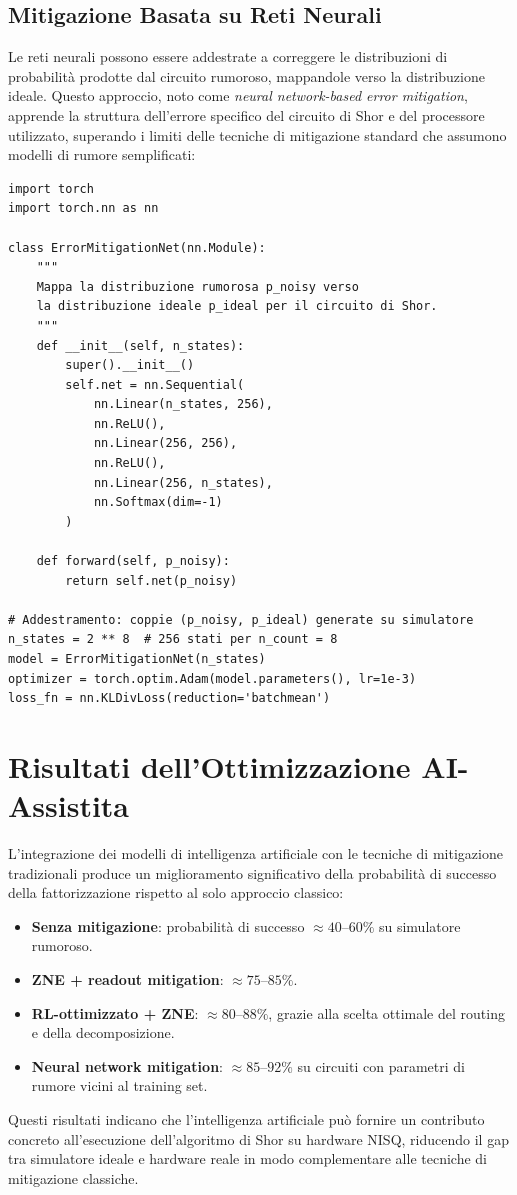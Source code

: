 \begin{onehalfspace}
\subsection{Mitigazione Basata su Reti Neurali}

Le reti neurali possono essere addestrate a correggere le distribuzioni di probabilità prodotte dal circuito rumoroso, mappandole verso la distribuzione ideale. Questo approccio, noto come \textit{neural network-based error mitigation}, apprende la struttura dell'errore specifico del circuito di Shor e del processore utilizzato, superando i limiti delle tecniche di mitigazione standard che assumono modelli di rumore semplificati:

\begin{lstlisting}[caption={Rete neurale per la correzione delle distribuzioni di probabilità}]
import torch
import torch.nn as nn

class ErrorMitigationNet(nn.Module):
    """
    Mappa la distribuzione rumorosa p_noisy verso
    la distribuzione ideale p_ideal per il circuito di Shor.
    """
    def __init__(self, n_states):
        super().__init__()
        self.net = nn.Sequential(
            nn.Linear(n_states, 256),
            nn.ReLU(),
            nn.Linear(256, 256),
            nn.ReLU(),
            nn.Linear(256, n_states),
            nn.Softmax(dim=-1)
        )

    def forward(self, p_noisy):
        return self.net(p_noisy)

# Addestramento: coppie (p_noisy, p_ideal) generate su simulatore
n_states = 2 ** 8  # 256 stati per n_count = 8
model = ErrorMitigationNet(n_states)
optimizer = torch.optim.Adam(model.parameters(), lr=1e-3)
loss_fn = nn.KLDivLoss(reduction='batchmean')
\end{lstlisting}

\section{Risultati dell'Ottimizzazione AI-Assistita}

L'integrazione dei modelli di intelligenza artificiale con le tecniche di mitigazione tradizionali produce un miglioramento significativo della probabilità di successo della fattorizzazione rispetto al solo approccio classico:

\begin{itemize}
    \item \textbf{Senza mitigazione}: probabilità di successo $\approx 40$--$60\%$ su simulatore rumoroso.
    \item \textbf{ZNE + readout mitigation}: $\approx 75$--$85\%$.
    \item \textbf{RL-ottimizzato + ZNE}: $\approx 80$--$88\%$, grazie alla scelta ottimale del routing e della decomposizione.
    \item \textbf{Neural network mitigation}: $\approx 85$--$92\%$ su circuiti con parametri di rumore vicini al training set.
\end{itemize}

Questi risultati indicano che l'intelligenza artificiale può fornire un contributo concreto all'esecuzione dell'algoritmo di Shor su hardware NISQ, riducendo il gap tra simulatore ideale e hardware reale in modo complementare alle tecniche di mitigazione classiche.

\end{onehalfspace}
